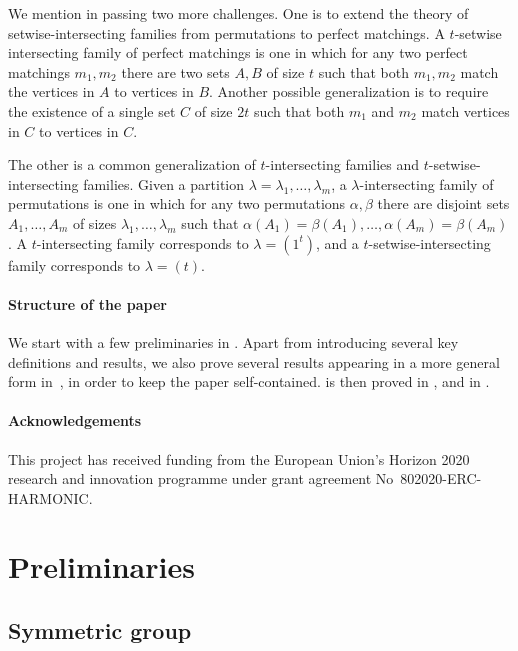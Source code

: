 \documentclass[10pt,a4paper]{amsart}
\theoremstyle{definition}
\begin{document}
\smallskip

We mention in passing two more challenges. One is to extend the theory of setwise-intersecting families from permutations to perfect matchings. A $t$-setwise intersecting family of perfect matchings is one in which for any two perfect matchings $m_1,m_2$ there are two sets $A,B$ of size $t$ such that both $m_1,m_2$ match the vertices in $A$ to vertices in $B$. Another possible generalization is to require the existence of a single set $C$ of size $2t$ such that both $m_1$ and $m_2$ match vertices in $C$ to vertices in $C$.

The other is a common generalization of $t$-intersecting families and $t$-setwise-intersecting families. Given a partition $\lambda = \lambda_1,\ldots,\lambda_m$, a $\lambda$-intersecting family of permutations is one in which for any two permutations $\alpha,\beta$ there are disjoint sets $A_1,\ldots,A_m$ of sizes $\lambda_1,\ldots,\lambda_m$ such that $\alpha(A_1) = \beta(A_1),\ldots,\alpha(A_m)=\beta(A_m)$. A $t$-intersecting family corresponds to $\lambda = (1^t)$, and a $t$-setwise-intersecting family corresponds to $\lambda = (t)$.

\paragraph{Structure of the paper} We start with a few preliminaries in . Apart from introducing several key definitions and results, we also prove several results appearing in a more general form in~\cite{DFLLV}, in order to keep the paper self-contained.  is then proved in , and  in .

\paragraph{Acknowledgements} This project has received funding from the European Union's Horizon 2020 research and innovation programme under grant agreement No~802020-ERC-HARMONIC.

\section{Preliminaries} \label{sec:prel}

\subsection{Symmetric group} \label{sec:prel-sym}
\end{document}
